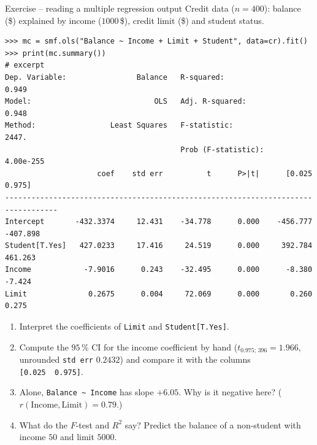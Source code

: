 \documentclass[aspectratio=169,11pt]{beamer}
\begin{document}
\begin{frame}[fragile]{Exercise -- reading a multiple regression output}
  \footnotesize
  Credit data ($n=400$): balance (\$) explained by income ($1000$\,\$), credit
  limit (\$) and student status.
\begin{lstlisting}[style=Pyout]
>>> mc = smf.ols("Balance ~ Income + Limit + Student", data=cr).fit()
>>> print(mc.summary())                                               # excerpt
Dep. Variable:                Balance   R-squared:                       0.949
Model:                            OLS   Adj. R-squared:                  0.948
Method:                 Least Squares   F-statistic:                     2447.
                                        Prob (F-statistic):          4.00e-255
                     coef    std err          t      P>|t|      [0.025      0.975]
----------------------------------------------------------------------------------
Intercept       -432.3374     12.431    -34.778      0.000    -456.777    -407.898
Student[T.Yes]   427.0233     17.416     24.519      0.000     392.784     461.263
Income            -7.9016      0.243    -32.495      0.000      -8.380      -7.424
Limit              0.2675      0.004     72.069      0.000       0.260       0.275
\end{lstlisting}
  \begin{enumerate}
    \item Interpret the coefficients of \texttt{Limit} and \texttt{Student[T.Yes]}.
    \item Compute the $95\,\%$ CI for the income coefficient by hand
          ($t_{0.975;\,396}=1.966$, unrounded \texttt{std err} $0.2432$) and
          compare it with the columns \texttt{[0.025\ \ 0.975]}.
    \item Alone, \texttt{Balance \textasciitilde\ Income} has slope $+6.05$.
          Why is it negative here? ($r(\text{Income},\text{Limit})=0.79$.)
    \item What do the $F$-test and $R^2$ say? Predict the balance of a
          non-student with income $50$ and limit $5000$.
  \end{enumerate}
\end{frame}
\end{document}
